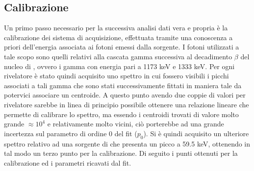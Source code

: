 \subsection{Calibrazione}
Un primo passo necessario per la successiva analisi dati vera e propria è la calibrazione dei sistema di acquisizione, effettuata tramite una conoscenza a priori dell'energia
associata ai fotoni emessi dalla sorgente. I fotoni utilizzati a tale scopo sono quelli relativi alla cascata gamma successiva al decadimento $\beta$ del nucleo di , ovvero
i gamma con energia pari a 1173 keV e 1333 keV. Per ogni rivelatore è stato quindi acquisito uno spettro in cui fossero visibili i picchi associati a tali gamma che sono stati
successivamente fittati in maniera tale da potervici associare un centroide. A questo punto avendo due coppie di valori per rivelatore sarebbe in linea di principio possibile
ottenere una relazione lineare che permette di calibrare lo spettro, ma essendo i centroidi trovati di valore molto grande $\approx 10^4$ e relativamente molto vicini, ciò
porterebbe ad una grande incertezza sul parametro di ordine 0 del fit ($p_0$). Si è quindi acquisito un ulteriore spettro relativo ad una sorgente di  
che presenta 
un picco a 59.5 keV, ottenendo in tal modo un terzo punto per la calibrazione. Di seguito i punti ottenuti per la calibrazione ed i parametri ricavati dal fit.



